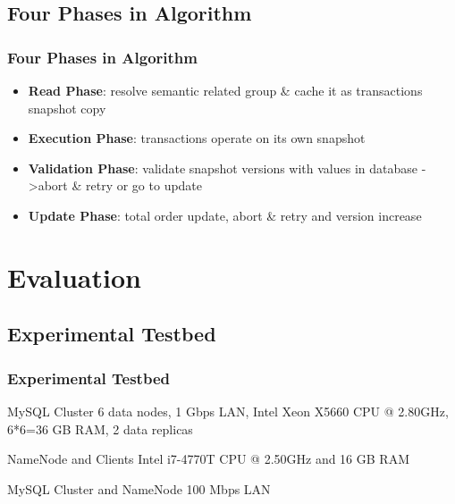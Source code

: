 \documentclass{beamer}
\begin{document}
\subsection{Four Phases in Algorithm}
\begin{frame}
	\frametitle{Four Phases in Algorithm}
	\begin{itemize}
		\item \textbf{Read Phase}: resolve semantic related group \& cache it as transactions snapshot copy
		\item \textbf{Execution Phase}: transactions operate on its own snapshot
		\item \textbf{Validation Phase}: validate snapshot versions with values in database -\textgreater abort \& retry or go to update
		\item \textbf{Update Phase}: total order update, abort \& retry and version increase
	\end{itemize}
\end{frame}

\section{Evaluation}

\subsection{Experimental Testbed}
\begin{frame}
	\frametitle{Experimental Testbed}
	\begin{block}{MySQL Cluster}
		6 data nodes, 1 Gbps LAN, Intel Xeon X5660 CPU @ 2.80GHz, 6*6=36 GB RAM, 2 data replicas
	\end{block}
	\begin{block}{NameNode and Clients}
		Intel i7-4770T CPU @ 2.50GHz and 16 GB RAM
	\end{block}
	\begin{block}{MySQL Cluster and NameNode}
		100 Mbps LAN
	\end{block}
\end{frame}
\end{document}
